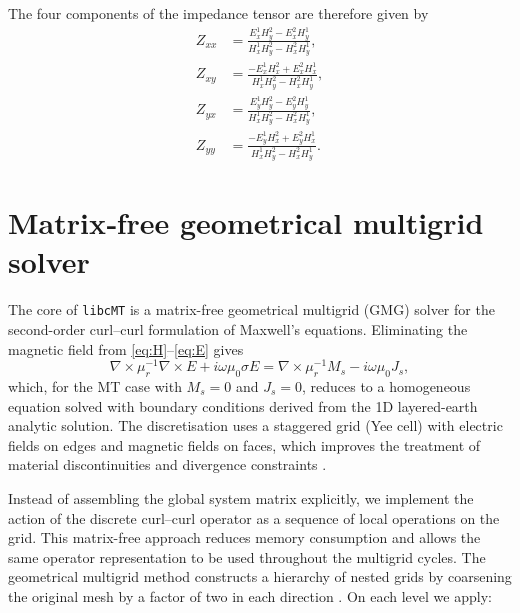 \documentclass{article}
\begin{document}
The four components of the impedance tensor are therefore given by
\begin{subequations}\label{eq:Zij}
  \begin{align}
    Z_{xx} &= \frac{E_x^1 H_y^2 - E_x^2 H_y^1}{H_x^1 H_y^2 - H_x^2 H_y^1},\\
    Z_{xy} &= \frac{-E_x^1 H_x^2 + E_x^2 H_x^1}{H_x^1 H_y^2 - H_x^2 H_y^1},\\
    Z_{yx} &= \frac{E_y^1 H_y^2 - E_y^2 H_y^1}{H_x^1 H_y^2 - H_x^2 H_y^1},\\
    Z_{yy} &= \frac{-E_y^1 H_x^2 + E_y^2 H_x^1}{H_x^1 H_y^2 - H_x^2 H_y^1}.
  \end{align}
\end{subequations}

\section{Matrix‑free geometrical multigrid solver}

The core of \texttt{libcMT} is a matrix-free geometrical multigrid (GMG) solver for the second-order curl--curl formulation of Maxwell's equations. Eliminating the magnetic field from \eqref{eq:H}--\eqref{eq:E} gives
\begin{equation}\label{eq:curlcurl}
\nabla\times\mu_r^{-1} \nabla \times E + i\omega\mu_0\sigma E = \nabla\times \mu_r^{-1} M_s - i\omega\mu_0 J_s,
\end{equation}
which, for the MT case with $M_s=0$ and $J_s=0$, reduces to a homogeneous equation solved with boundary conditions derived from the 1D layered-earth analytic solution. The discretisation uses a staggered grid (Yee cell) with electric fields on edges and magnetic fields on faces, which improves the treatment of material discontinuities and divergence constraints \citep{Yee1966}.

Instead of assembling the global system matrix explicitly, we implement the action of the discrete curl--curl operator as a sequence of local operations on the grid. This matrix-free approach reduces memory consumption and allows the same operator representation to be used throughout the multigrid cycles. The geometrical multigrid method constructs a hierarchy of nested grids by coarsening the original mesh by a factor of two in each direction \citep{BriggsEtAl2000}. On each level we apply:
\end{document}
